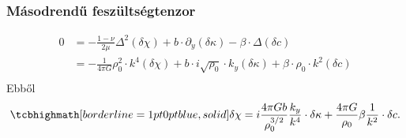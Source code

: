 \documentclass[10pt,a4paper]{scrartcl}
\begin{document}
\subsubsection{Másodrendű feszültségtenzor}
\[\begin{aligned}
  0 &  =  - \frac{{1 - \nu }}{{2\mu }}{\Delta ^2}\left( {\delta \chi } \right) + b \cdot {\partial _y}\left( {\delta \kappa } \right) - \beta  \cdot \Delta \left( {\delta c} \right) \\ 
   &  =  - \frac{1}{{4\pi G}}\rho _0^2 \cdot {k^4}\left( {\delta \chi } \right) + b \cdot i\sqrt {{\rho _0}}  \cdot {k_y}\left( {\delta \kappa } \right) + \beta  \cdot {\rho _0} \cdot {k^2}\left( {\delta c} \right) \\ 
\end{aligned} \]
Ebből
\begin{equation} \label{eq:lin_ed_chi}
\tcbhighmath[borderline={1pt}{0pt}{blue,solid}]{
\delta \chi  = i\frac{{4\pi Gb}}{{\rho _0^{3/2}}}\frac{{{k_y}}}{{{k^4}}} \cdot \delta \kappa  + \frac{{4\pi G}}{{{\rho _0}}}\beta \frac{1}{{{k^2}}} \cdot \delta c.}
\end{equation}
\end{document}
